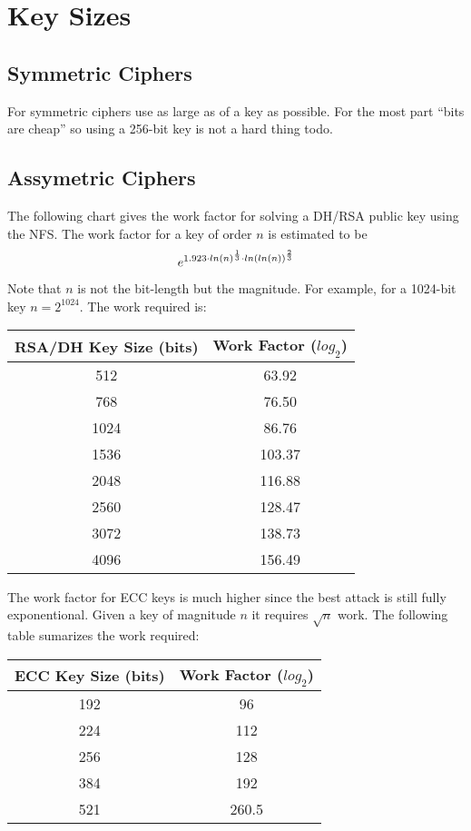 \documentclass{book}
\begin{document}
\section{Key Sizes}

\subsection{Symmetric Ciphers}
For symmetric ciphers use as large as of a key as possible.  For the most part ``bits are cheap'' so using a 256-bit key
is not a hard thing todo.  

\subsection{Assymetric Ciphers}
The following chart gives the work factor for solving a DH/RSA public key using the NFS.  The work factor for a key of order
$n$ is estimated to be
\begin{equation}
e^{1.923 \cdot ln(n)^{1 \over 3} \cdot ln(ln(n))^{2 \over 3}} 
\end{equation}

Note that $n$ is not the bit-length but the magnitude.  For example, for a 1024-bit key $n = 2^{1024}$.  The work required 
is:
\begin{center}
\begin{tabular}{|c|c|}
    \hline RSA/DH Key Size (bits) & Work Factor ($log_2$) \\
    \hline 512 & 63.92 \\
    \hline 768 & 76.50 \\
    \hline 1024 & 86.76 \\
    \hline 1536 & 103.37 \\
    \hline 2048 & 116.88 \\
    \hline 2560 & 128.47 \\
    \hline 3072 & 138.73 \\
    \hline 4096 & 156.49 \\
    \hline 
\end{tabular}
\end{center}

The work factor for ECC keys is much higher since the best attack is still fully exponentional.  Given a key of magnitude
$n$ it requires $\sqrt n$ work.  The following table sumarizes the work required:
\begin{center}
\begin{tabular}{|c|c|}
    \hline ECC Key Size (bits) & Work Factor ($log_2$) \\
    \hline 192 & 96  \\
    \hline 224 & 112 \\
    \hline 256 & 128 \\
    \hline 384 & 192 \\
    \hline 521 & 260.5 \\
    \hline
\end{tabular}
\end{center}
\end{document}
